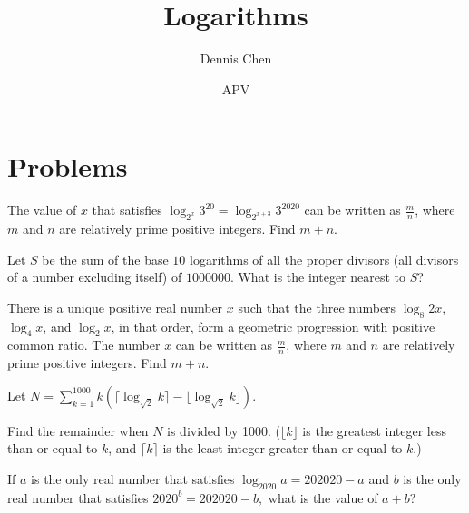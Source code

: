 \documentclass[mast]{lucky}
\title{Logarithms}
\author{Dennis Chen}
\date{APV}
\begin{document}
\maketitle



\pagebreak

\section{Problems}


\begin{prob}[AIME II 2020/3]{1}
The value of $x$ that satisfies $\log_{2^x} 3^{20} = \log_{2^{x+3}} 3^{2020}$ can be written as $\frac{m}{n}$, where $m$ and $n$ are relatively prime positive integers. Find $m+n$.
\end{prob}

\begin{prob}[AIME 1986/8]{2}
Let $S$ be the sum of the base $10$ logarithms of all the proper divisors (all divisors of a number excluding itself) of $1000000$. What is the integer nearest to $S$?
\end{prob}

\begin{prob}[AIME I 2020/2]{2}
There is a unique positive real number $x$ such that the three numbers $\log_8{2x}$, $\log_4{x}$, and $\log_2{x}$, in that order, form a geometric progression with positive common ratio. The number $x$ can be written as $\frac{m}{n}$, where $m$ and $n$ are relatively prime positive integers. Find $m + n$.
\end{prob}

\begin{prob}[AIME I 2007/7]{2}
Let $N = \sum\limits_{k = 1}^{1000} k ( \lceil \log_{\sqrt{2}} k \rceil  - \lfloor \log_{\sqrt{2}} k \rfloor ).$

Find the remainder when $N$ is divided by 1000. ($\lfloor{k}\rfloor$ is the greatest integer less than or equal to $k$, and $\lceil{k}\rceil$ is the least integer greater than or equal to $k$.)
\end{prob}

\begin{prob}[SMT 2020]{3}
If $a$ is the only real number that satisfies $\log_{2020}a=202020-a$ and $b$ is the only real number that satisfies $2020^b=202020-b,$ what is the value of $a+b?$
\end{prob}
\end{document}
